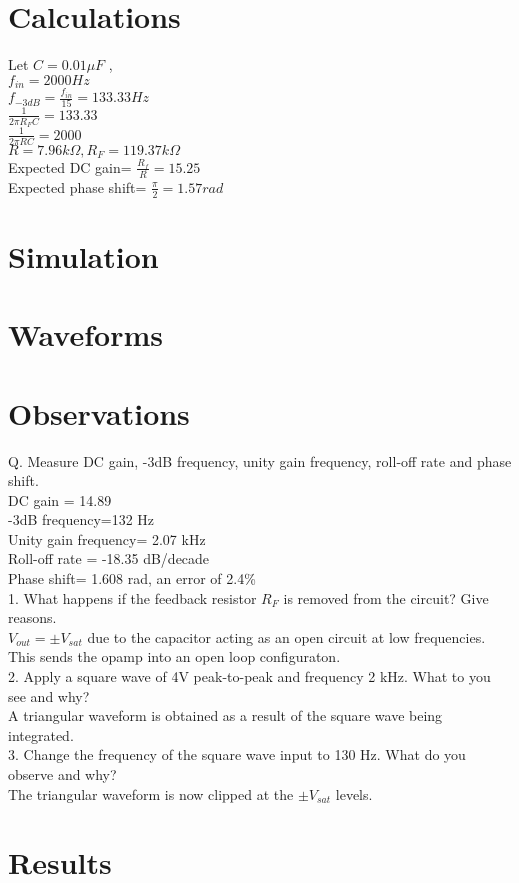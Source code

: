 \documentclass[12pt, titlepage]{article}
\theoremstyle{definition}
\begin{document}
  

  \section{Calculations}
  Let $C=0.01\mu F$ , \\
  $f_{in}=2000 Hz$\\
  $f_{-3dB}=\frac{f_{in}}{15} = 133.33 Hz$ \\
  $\frac{1}{2\pi R_{F}C} = 133.33$\\
  $\frac{1}{2\pi RC} = 2000$\\
  $R=7.96k\Omega, R_{F}=119.37k\Omega$\\
  Expected DC gain= $\frac{R_{f}}{R}=15.25$\\
  Expected phase shift= $\frac{\pi}{2}=1.57 rad$
  



  \newpage
  \section{Simulation}

  \newpage
  \section{Waveforms}

  \newpage
  \section{Observations}
  Q. Measure DC gain, -3dB frequency, unity gain frequency, roll-off rate and phase shift.\\
   DC gain = 14.89 \\
  -3dB frequency=132 Hz\\
   Unity gain frequency= 2.07 kHz \\
   Roll-off rate = -18.35 dB/decade\\
   Phase shift= 1.608 rad, an error of 2.4\% \\
   
  1. What happens if the feedback resistor $R_{F}$ is removed from the circuit? Give reasons.\\
$V_{out}=\pm V_{sat}$ due to the capacitor acting as an open circuit at low frequencies. This sends the opamp into an open loop configuraton. \\

2. Apply a square wave of 4V peak-to-peak and frequency 2 kHz. What to you see and why?\\
A triangular waveform is obtained as a result of the square wave being integrated. \\

3. Change the frequency of the square wave input to 130 Hz. What do you observe and why?\\
The triangular waveform is now clipped at the $\pm V_{sat}$ levels.
 

  \newpage
  \section{Results}
\end{document}
